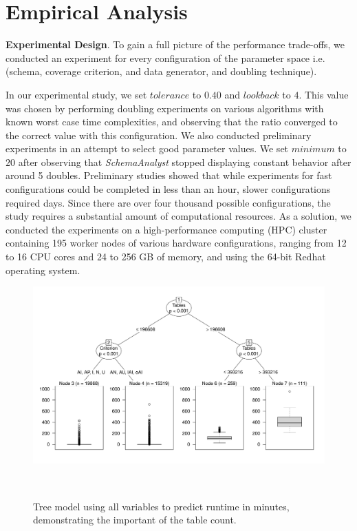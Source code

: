 
\section{Empirical Analysis}

\textbf{Experimental Design}. To gain a full picture of the performance trade-offs, we conducted an experiment for every configuration
of the parameter space i.e. (schema, coverage criterion, and data generator, and doubling technique). 

In our experimental study, we set $\mathit{tolerance}$ to $0.40$ and $\mathit{lookback}$ to $4$. This value was chosen
by performing doubling experiments on various algorithms with known worst case time complexities, and observing that the
ratio converged to the correct value with this configuration.  We also conducted preliminary experiments in an attempt
to select good parameter values. We set $\mathit{minimum}$ to $20$ after observing that \textit{SchemaAnalyst} stopped
displaying constant behavior after around 5 doubles.  Preliminary studies showed that while experiments for fast
configurations could be completed in less than an hour, slower configurations required days.  Since there are over four
thousand possible configurations, the study requires a substantial amount of computational resources.  As a solution, we
conducted the experiments on a high-performance computing (HPC) cluster containing 195 worker nodes of various hardware
configurations, ranging from 12 to 16 CPU cores and 24 to 256 GB of memory, and using the 64-bit Redhat operating
system.



\begin{figure}[t]
\centering
  \centering
  \includegraphics[width=1.025\linewidth]{diagrams/AllTree.pdf}
  \vspace*{-.25in}
  \caption{Tree model using all variables to predict runtime in minutes, demonstrating the important of the table count.
  \vspace{-.30in}}~\label{fig:atree}
\end{figure}
